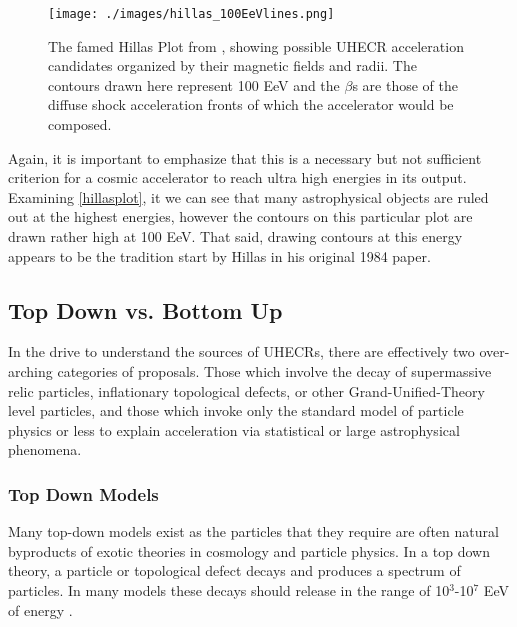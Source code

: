 \begin{figure}
\begin{center}
\texttt{[image: ./images/hillas\_100EeVlines.png]}
\caption[Hillas Plot]{The famed Hillas Plot from \cite{stanev}, showing possible UHECR acceleration candidates organized by their magnetic fields and radii. The contours drawn here represent 100 EeV and the $\beta$s are those of the diffuse shock acceleration fronts of which the accelerator would be composed.}
\label{hillasplot}
\end{center}
\end{figure}
Again, it is important to emphasize that this is a necessary but not sufficient criterion for a cosmic accelerator to reach ultra high energies in its output. Examining \autoref{hillasplot}, it we can see that many astrophysical objects are ruled out at the highest energies, however the contours on this particular plot are drawn rather high at 100 EeV. That said, drawing contours at this energy appears to be the tradition start by Hillas in his original 1984 paper.
\subsection{Top Down vs. Bottom Up}%
In the drive to understand the sources of UHECRs, there are effectively two over-arching categories of proposals. Those which involve the decay of supermassive relic particles, inflationary topological defects, or other Grand-Unified-Theory level particles, and those which invoke only the standard model of particle physics or less to explain acceleration via statistical or large astrophysical phenomena. 
\subsubsection{Top Down Models}
Many top-down models exist as the particles that they require are often natural byproducts of exotic theories in cosmology and particle physics. In a top down theory, a particle or topological defect decays and produces a spectrum of particles. In many models these decays should release in the range of 10$^3$-10$^7$ EeV of energy \cite{stanev}. 

